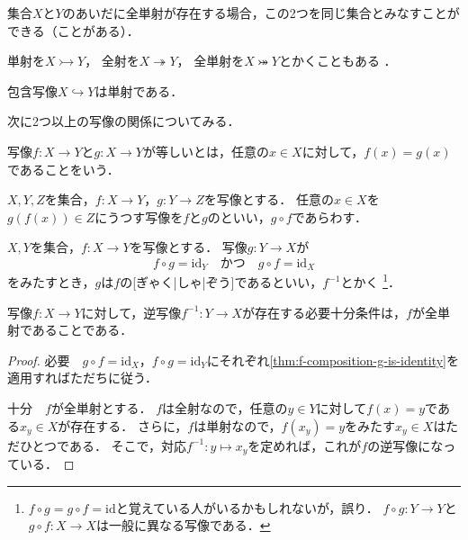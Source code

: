 \documentclass[../sotsu.tex]{subfiles}
\begin{document}
集合$X$と$Y$のあいだに全単射が存在する場合，この2つを同じ集合とみなすことができる（ことがある）．

単射を$X \rightarrowtail Y$，
全射を$X \twoheadrightarrow Y$，
全単射を$X \twoheadrightarrowtail Y$とかくこともある%
\cite{unicode-arrows}\cite{unicode-arrows-B}．

\begin{example}
    包含写像$X \hookrightarrow Y$は単射である．
\end{example}

次に2つ以上の写像の関係についてみる．

\begin{definition}[写像の一致]
    写像$f \colon X \to Y$と$g \colon X \to Y$が等しいとは，任意の$x \in X$に対して，$f(x) = g(x)$であることをいう．
\end{definition}

\begin{definition}[写像の合成]
    \label{dfn:map-composition}
    $X, Y, Z$を集合，$f \colon X \to Y$，$g \colon Y \to Z$を写像とする．
    任意の$x \in X$を$g(f(x)) \in Z$にうつす写像を$f$と$g$のといい，$g \circ f$であらわす．
\end{definition}

\begin{definition}[逆写像]
    \label{dfn:inverse-map}
    $X, Y$を集合，$f \colon X \to Y$を写像とする．
    写像$g \colon Y \to X$が
    \[  f \circ g = \mathrm{id}_Y  \quad \text{かつ} \quad  g \circ f = \mathrm{id}_X  \]
    をみたすとき，$g$は$f$の[ぎゃく|しゃ|ぞう]であるといい，$f^{-1}$とかく%
    \footnote{
        $f \circ g = g \circ f = \mathrm{id}$と覚えている人がいるかもしれないが，誤り．
        $f \circ g \colon Y \to Y$と$g \circ f \colon X \to X$は一般に異なる写像である．
    }．
\end{definition}

\begin{theorem}
    \label{thm:inverse-map-exists-iff}
    写像$f \colon X \to Y$に対して，逆写像$f^{-1} \colon Y \to X$が存在する必要十分条件は，$f$が全単射であることである．
\end{theorem}

\begin{proof}
    \textsf{必要}　$g \circ f = \mathrm{id}_X$，$f \circ g = \mathrm{id}_Y$にそれぞれ\cref{thm:f-composition-g-is-identity}を適用すればただちに従う．

    \textsf{十分}　$f$が全単射とする．
    $f$は全射なので，任意の$y \in Y$に対して$f(x) = y$である$x_y \in X$が存在する．
    さらに，$f$は単射なので，$f(x_y) = y$をみたす$x_y \in X$はただひとつである．
    そこで，対応$f^{-1} \colon y \mapsto x_y$を定めれば，これが$f$の逆写像になっている．
\end{proof}
\end{document}
